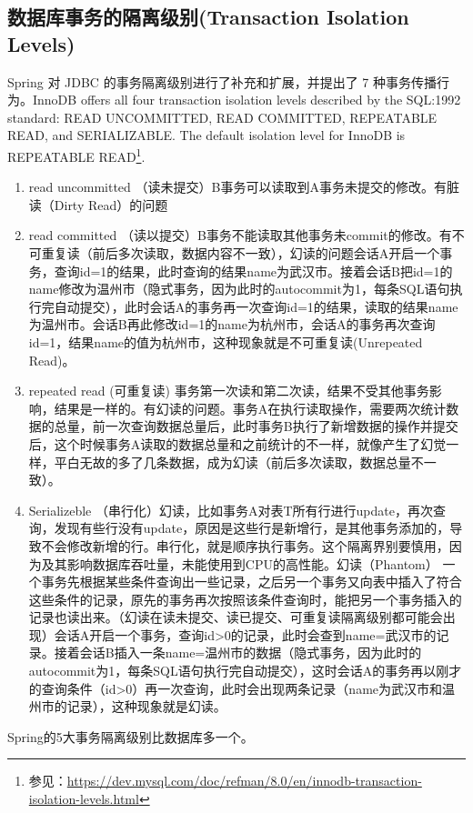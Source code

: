 \documentclass[../../../interview-questions.tex]{subfiles}
\begin{document}
\subsection{数据库事务的隔离级别(Transaction Isolation Levels)}

Spring 对 JDBC 的事务隔离级别进行了补充和扩展，并提出了 7 种事务传播行为。InnoDB offers all four transaction isolation levels described by the SQL:1992 standard: READ UNCOMMITTED, READ COMMITTED, REPEATABLE READ, and SERIALIZABLE. The default isolation level for InnoDB is REPEATABLE READ\footnote{参见：\url{https://dev.mysql.com/doc/refman/8.0/en/innodb-transaction-isolation-levels.html}}.

\begin{enumerate}
\item {read uncommitted （读未提交）B事务可以读取到A事务未提交的修改。有脏读（Dirty Read）的问题}
\item{read committed （读以提交）B事务不能读取其他事务未commit的修改。有不可重复读（前后多次读取，数据内容不一致），幻读的问题}会话A开启一个事务，查询id=1的结果，此时查询的结果name为武汉市。接着会话B把id=1的name修改为温州市（隐式事务，因为此时的autocommit为1，每条SQL语句执行完自动提交），此时会话A的事务再一次查询id=1的结果，读取的结果name为温州市。会话B再此修改id=1的name为杭州市，会话A的事务再次查询id=1，结果name的值为杭州市，这种现象就是不可重复读(Unrepeated Read)。
\item{repeated read (可重复读) 事务第一次读和第二次读，结果不受其他事务影响，结果是一样的。有幻读的问题。事务A在执行读取操作，需要两次统计数据的总量，前一次查询数据总量后，此时事务B执行了新增数据的操作并提交后，这个时候事务A读取的数据总量和之前统计的不一样，就像产生了幻觉一样，平白无故的多了几条数据，成为幻读（前后多次读取，数据总量不一致）。}
\item{Serializeble （串行化）幻读，比如事务A对表T所有行进行update，再次查询，发现有些行没有update，原因是这些行是新增行，是其他事务添加的，导致不会修改新增的行。串行化，就是顺序执行事务。这个隔离界别要慎用，因为及其影响数据库吞吐量，未能使用到CPU的高性能。}幻读（Phantom）
一个事务先根据某些条件查询出一些记录，之后另一个事务又向表中插入了符合这些条件的记录，原先的事务再次按照该条件查询时，能把另一个事务插入的记录也读出来。（幻读在读未提交、读已提交、可重复读隔离级别都可能会出现）会话A开启一个事务，查询id>0的记录，此时会查到name=武汉市的记录。接着会话B插入一条name=温州市的数据（隐式事务，因为此时的autocommit为1，每条SQL语句执行完自动提交），这时会话A的事务再以刚才的查询条件（id>0）再一次查询，此时会出现两条记录（name为武汉市和温州市的记录），这种现象就是幻读。
\end{enumerate}

Spring的5大事务隔离级别比数据库多一个。
\end{document}
